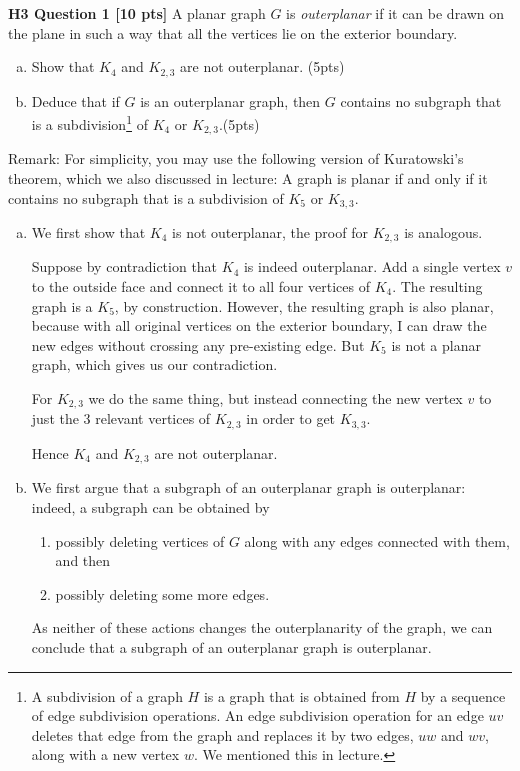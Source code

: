 \documentclass[10pt,landscape]{article}
\begin{document}
\begin{multicols}{2}
\bigskip
\textbf{H3 Question 1 [10 pts]}
A planar graph $G$ is \emph{outerplanar} if it can be drawn on the plane in such a way that all the vertices lie on the exterior boundary.
\begin{enumerate}[(a)]
    \item Show that $K_4$ and $K_{2,3}$ are not outerplanar. (5pts)
    \item Deduce that if $G$ is an outerplanar graph, then $G$ contains no subgraph that is a subdivision\footnote{A subdivision of a graph $H$ is a graph that is obtained from $H$  by a sequence of edge subdivision operations. An edge subdivision operation for an edge $uv$ deletes that edge from the graph and replaces it by two edges, $uw$ and $wv$, along with a new vertex $w$. We mentioned this in lecture.}  of $K_4$ or $K_{2,3}$.(5pts)
\end{enumerate}

\noindent Remark: For simplicity, you may use the following version of Kuratowski's theorem, which we also discussed in lecture: A graph is planar if and only if it contains no subgraph that is a subdivision of $K_5$ or $K_{3,3}$.


\begin{enumerate}[(a)]
\item We first show that $K_4$ is not outerplanar, the proof for $K_{2,3}$ is analogous.

Suppose by contradiction that $K_4$ is indeed outerplanar. Add a single vertex $v$ to the outside face and connect it to all four vertices of $K_4$. 
The resulting graph is a $K_5$, by construction. However, the resulting graph is also planar, because with all original vertices on the exterior boundary, I can draw the new edges without crossing any pre-existing edge. But $K_5$ is not a planar graph, which gives us our contradiction.

For $K_{2,3}$ we do the same thing, but instead connecting the new vertex $v$ to just the 3 relevant vertices of $K_{2,3}$ in order to get $K_{3,3}$. 

Hence $K_4$ and $K_{2,3}$ are not outerplanar.  

\item
We first argue that a subgraph of an outerplanar graph is outerplanar: indeed, a subgraph can be obtained by
\begin{enumerate}[(1)]
\item possibly deleting vertices of $G$ along with any edges connected with them, and then 
\item possibly deleting some more edges. 
\end{enumerate}
As neither of these actions changes the outerplanarity of the graph, we can conclude that a subgraph of an outerplanar graph is outerplanar.


\end{enumerate}
\end{multicols}
\end{document}

